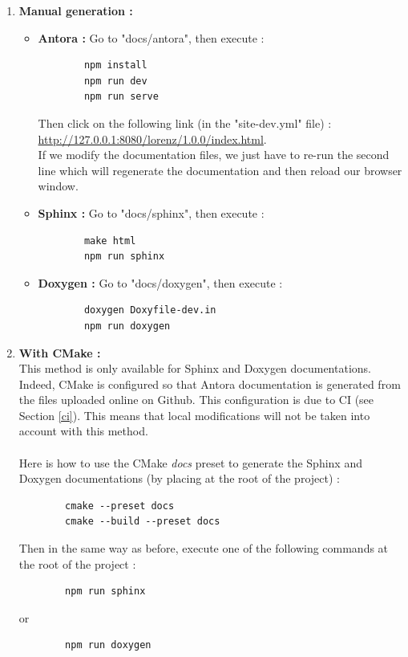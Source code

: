 	\begin{enumerate}[label=\textbullet]
		\item \textbf{Manual generation :} 
		\begin{itemize}[label=-]
			\item \textbf{Antora :} Go to "docs/antora", then execute :
\begin{lstlisting}
		npm install
		npm run dev
		npm run serve
\end{lstlisting}
			Then click on the following link (in the "site-dev.yml" file) : \\ \url{http://127.0.0.1:8080/lorenz/1.0.0/index.html}. \\
			If we modify the documentation files, we just have to re-run the second line which will regenerate the documentation and then reload our browser window.
			\item \textbf{Sphinx :} Go to "docs/sphinx", then execute :
\begin{lstlisting}
		make html
		npm run sphinx
\end{lstlisting}
			\item \textbf{Doxygen :} Go to "docs/doxygen", then execute :
\begin{lstlisting}
		doxygen Doxyfile-dev.in
		npm run doxygen
\end{lstlisting}
		\end{itemize}
		\newpage
		\item \textbf{With CMake :} \\
		\danger This method is only available for Sphinx and Doxygen documentations. Indeed, CMake is configured so that Antora documentation is generated from the files uploaded online on Github. This configuration is due to CI (see Section \ref{ci}). This means that local modifications will not be taken into account with this method. \\ \; \\
		Here is how to use the CMake \textit{docs} preset to generate the Sphinx and Doxygen documentations (by placing at the root of the project) :
\begin{lstlisting}
		cmake --preset docs
		cmake --build --preset docs
\end{lstlisting}
		Then in the same way as before, execute one of the following commands at the root of the project :
\begin{lstlisting}
		npm run sphinx
\end{lstlisting}
		or
\begin{lstlisting}
		npm run doxygen
\end{lstlisting}
	\end{enumerate}

